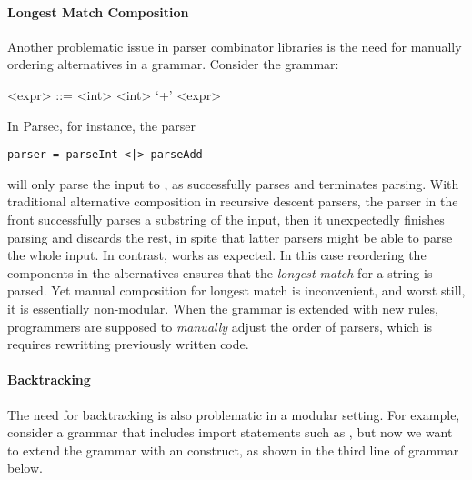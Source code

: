\paragraph{Longest Match Composition} Another problematic issue
in parser combinator libraries is the need for manually ordering
alternatives in a grammar.
Consider the grammar:
\setlength{\grammarindent}{5em}
\begin{grammar}
<expr> ::= <int> \alt <int> `+' <expr>
\end{grammar}
In Parsec, for instance, the parser
\begin{lstlisting}[language=PlainCode]
parser = parseInt <|> parseAdd
\end{lstlisting}
will only parse the input  to , as  successfully parses 
and terminates parsing. With traditional alternative
composition in recursive descent parsers, the parser in the front successfully parses a substring of the input, then it unexpectedly
finishes parsing and discards the rest, in spite that latter parsers might be able to parse the whole input.
In contrast,  works as expected.
In this case reordering the components in the alternatives ensures that
the \emph{longest match} for a string is parsed. Yet manual composition for longest match is inconvenient, and worst still, it is essentially non-modular. When the grammar is extended with new rules, programmers are supposed to \emph{manually} adjust
the order of parsers, which is requires rewritting previously written code.

\paragraph{Backtracking} The need for backtracking is also problematic
in a modular setting. For example, consider a grammar that includes
import statements such as ,
but now we want to extend the grammar with an  construct, as shown in the third line of grammar below.

